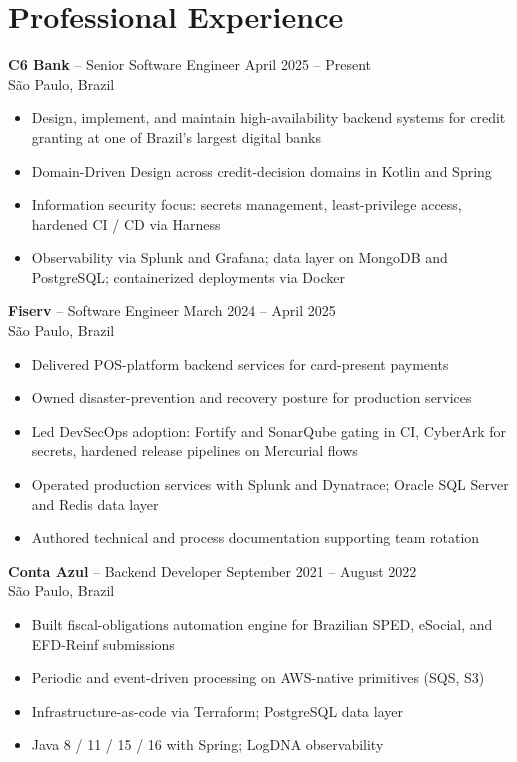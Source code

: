 \documentclass[11pt,a4paper]{article}
\begin{document}
\section{Professional Experience}

\noindent\textbf{C6 Bank} -- Senior Software Engineer \hfill April 2025 -- Present\\
São Paulo, Brazil
\begin{itemize}
\item Design, implement, and maintain high-availability backend systems for credit granting at one of Brazil's largest digital banks
\item Domain-Driven Design across credit-decision domains in Kotlin and Spring
\item Information security focus: secrets management, least-privilege access, hardened CI / CD via Harness
\item Observability via Splunk and Grafana; data layer on MongoDB and PostgreSQL; containerized deployments via Docker
\end{itemize}

\noindent\textbf{Fiserv} -- Software Engineer \hfill March 2024 -- April 2025\\
São Paulo, Brazil
\begin{itemize}
\item Delivered POS-platform backend services for card-present payments
\item Owned disaster-prevention and recovery posture for production services
\item Led DevSecOps adoption: Fortify and SonarQube gating in CI, CyberArk for secrets, hardened release pipelines on Mercurial flows
\item Operated production services with Splunk and Dynatrace; Oracle SQL Server and Redis data layer
\item Authored technical and process documentation supporting team rotation
\end{itemize}

\noindent\textbf{Conta Azul} -- Backend Developer \hfill September 2021 -- August 2022\\
São Paulo, Brazil
\begin{itemize}
\item Built fiscal-obligations automation engine for Brazilian SPED, eSocial, and EFD-Reinf submissions
\item Periodic and event-driven processing on AWS-native primitives (SQS, S3)
\item Infrastructure-as-code via Terraform; PostgreSQL data layer
\item Java 8 / 11 / 15 / 16 with Spring; LogDNA observability
\end{itemize}
\end{document}

